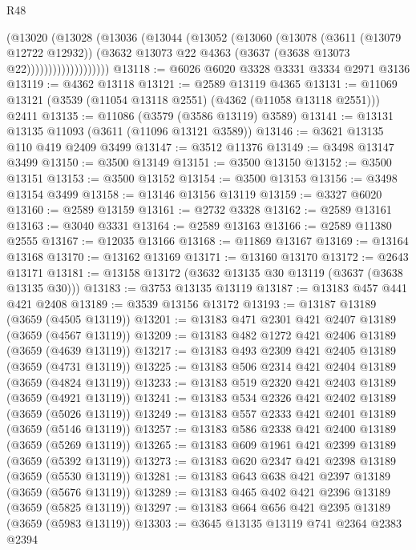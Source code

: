 \begin{lexlean}{R48}
\begin{coremodule}
                      (@13020
                        (@13028
                          (@13036
                            (@13044
                              (@13052
                                (@13060
                                  (@13078
                                    (@3611 (@13079 @12722 @12932))
                                    (@3632
                                      @13073
                                      @22
                                      @4363
                                      (@3637 (@3638 @13073 @22)))))))))))))))))))
@13118 := @6026 @6020 @3328 @3331 @3334 @2971 @3136
@13119 := @4362 @13118
@13121 := @2589 @13119 @4365
@13131 := @11069 @13121 (@3539 (@11054 @13118 @2551) (@4362 (@11058 @13118 @2551))) @2411
@13135 := @11086 (@3579 (@3586 @13119) @3589)
@13141 := @13131 @13135 @11093 (@3611 (@11096 @13121 @3589))
@13146 := @3621 @13135 @110 @419 @2409 @3499
@13147 := @3512 @11376
@13149 := @3498 @13147 @3499
@13150 := @3500 @13149
@13151 := @3500 @13150
@13152 := @3500 @13151
@13153 := @3500 @13152
@13154 := @3500 @13153
@13156 := @3498 @13154 @3499
@13158 := @13146 @13156 @13119
@13159 := @3327 @6020
@13160 := @2589 @13159
@13161 := @2732 @3328
@13162 := @2589 @13161
@13163 := @3040 @3331
@13164 := @2589 @13163
@13166 := @2589 @11380 @2555
@13167 := @12035 @13166
@13168 := @11869 @13167
@13169 := @13164 @13168
@13170 := @13162 @13169
@13171 := @13160 @13170
@13172 := @2643 @13171
@13181 := @13158 @13172 (@3632 @13135 @30 @13119 (@3637 (@3638 @13135 @30)))
@13183 := @3753 @13135 @13119
@13187 := @13183 @457 @441 @421 @2408
@13189 := @3539 @13156 @13172
@13193 := @13187 @13189 (@3659 (@4505 @13119))
@13201 := @13183 @471 @2301 @421 @2407 @13189 (@3659 (@4567 @13119))
@13209 := @13183 @482 @1272 @421 @2406 @13189 (@3659 (@4639 @13119))
@13217 := @13183 @493 @2309 @421 @2405 @13189 (@3659 (@4731 @13119))
@13225 := @13183 @506 @2314 @421 @2404 @13189 (@3659 (@4824 @13119))
@13233 := @13183 @519 @2320 @421 @2403 @13189 (@3659 (@4921 @13119))
@13241 := @13183 @534 @2326 @421 @2402 @13189 (@3659 (@5026 @13119))
@13249 := @13183 @557 @2333 @421 @2401 @13189 (@3659 (@5146 @13119))
@13257 := @13183 @586 @2338 @421 @2400 @13189 (@3659 (@5269 @13119))
@13265 := @13183 @609 @1961 @421 @2399 @13189 (@3659 (@5392 @13119))
@13273 := @13183 @620 @2347 @421 @2398 @13189 (@3659 (@5530 @13119))
@13281 := @13183 @643 @638 @421 @2397 @13189 (@3659 (@5676 @13119))
@13289 := @13183 @465 @402 @421 @2396 @13189 (@3659 (@5825 @13119))
@13297 := @13183 @664 @656 @421 @2395 @13189 (@3659 (@5983 @13119))
@13303 := @3645 @13135 @13119 @741 @2364 @2383 @2394

\end{coremodule}
\end{lexlean}
